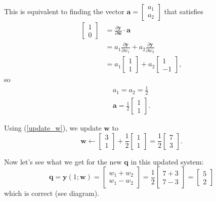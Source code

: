 \documentclass{article}
\renewcommand\vec{\mathbf}
\begin{document}
This is equivalent to finding the vector $\vec{a} = \begin{bmatrix} a_1 \\ a_2 \end{bmatrix}$ that satisfies
\begin{align*}
    \begin{bmatrix}
        1 \\
        0
    \end{bmatrix}
    &=
    \frac{\partial \vec{y}}{\partial \vec{w}} \cdot \vec{a}
    \\
    &=
    a_1
    \frac{\partial \vec{y}}{\partial w_1}
    +
    a_2
    \frac{\partial \vec{y}}{\partial w_2}
    \\
    &=
    a_1
    \begin{bmatrix}
        1 \\
        1
    \end{bmatrix}
    +
    a_2
    \begin{bmatrix}
        1 \\
        -1
    \end{bmatrix},
\end{align*}
so
\begin{align*}
    a_1 = a_2 = \frac{1}{2} \\
    \vec{a} =
    \frac{1}{2}
    \begin{bmatrix}
        1 \\
        1
    \end{bmatrix}.
\end{align*}

Using (\ref{update_w}), we update $\vec{w}$ to
\begin{equation*}
    \vec{w}
    \leftarrow
    \begin{bmatrix}
        3 \\
        1
    \end{bmatrix}
    +
    \frac{1}{2}
    \begin{bmatrix}
        1 \\
        1
    \end{bmatrix}
    =
    \frac{1}{2}
    \begin{bmatrix}
        7 \\
        3
    \end{bmatrix}.
\end{equation*}


Now let's see what we get for the new $\vec{q}$ in this updated system:
\begin{equation*}
    \vec{q} =
    \vec{y}(1; \vec{w}) =
    \begin{bmatrix}
        w_1 + w_2 \\
        w_1 - w_2
    \end{bmatrix} = 
    \frac{1}{2}
    \begin{bmatrix}
        7+3 \\
        7-3
    \end{bmatrix}
    =
    \begin{bmatrix}
        5 \\
        2
    \end{bmatrix}
\end{equation*}
which is correct (see diagram).
\end{document}
